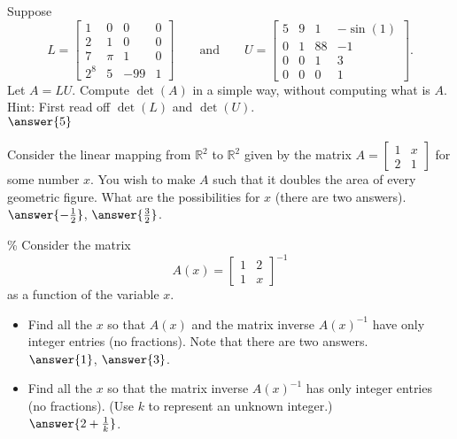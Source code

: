 \documentclass{ximera}
\begin{document}
\begin{exercise}
    Suppose
    \begin{equation*}
        L = \begin{bmatrix}
            1 & 0 & 0 & 0 \\
            2 & 1 & 0 & 0 \\
            7 & \pi & 1 & 0 \\
            2^8 & 5 & -99 & 1
        \end{bmatrix}
        \qquad \text{and} \qquad
        U = \begin{bmatrix}
            5 & 9 & 1 & -\sin(1) \\
            0 & 1 & 88 & -1 \\
            0 & 0 & 1 & 3 \\
            0 & 0 & 0 & 1
        \end{bmatrix} .
    \end{equation*}
    Let $A = LU$.  Compute $\det(A)$ in a simple way, without computing what is $A$. Hint: First read off $\det(L)$ and $\det(U)$.\\
    $\answer{5}$
\end{exercise}

\begin{exercise}
    Consider the linear mapping from ${\mathbb R}^2$ to ${\mathbb R}^2$ given by the  matrix
    $A = \left[ \begin{smallmatrix}
        1 & x \\
        2 & 1
    \end{smallmatrix} \right]$
    for some number $x$.  You wish to make $A$ such that it doubles the area of every geometric figure.  What are the possibilities for $x$ (there are two answers).\\
    $\answer{-\frac{1}{2}}$, $\answer{\frac{3}{2}}$.
\end{exercise}

\begin{exercise}[challenging]\%
    Consider the matrix
    \begin{equation*}
        A(x) = \begin{bmatrix}
            1 & 2 \\ 
            1 & x
        \end{bmatrix}^{-1}
    \end{equation*}
    as a function of the variable $x$.
    \begin{itemize}
        \item Find all the $x$ so that $A(x)$ and the matrix inverse $A(x)^{-1}$ have only integer entries (no fractions). Note that there are two answers.\\
        $\answer{1}$, $\answer{3}$.
        \item Find all the $x$ so that the matrix inverse $A(x)^{-1}$ has only integer entries (no fractions). (Use $k$ to represent an unknown integer.)\\
        $\answer{2 + \frac{1}{k}}$.
    \end{itemize}
\end{exercise}
\end{document}
